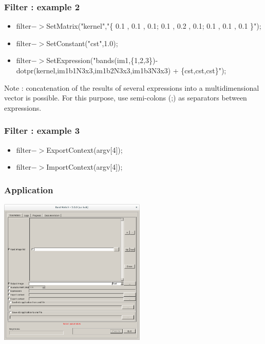 \documentclass[8pt]{beamer}
\begin{document}
\begin{frame}
\frametitle{Filter : example 2}


\begin{itemize}
\item filter$->$SetMatrix("kernel","\{ 0.1 , 0.1 , 0.1; 0.1 , 0.2 , 0.1; 0.1 , 0.1 , 0.1 \}");
\item filter$->$SetConstant("cst",1.0);
\item filter$->$SetExpression("bands(im1,\{1,2,3\})-dotpr(kernel,im1b1N3x3,im1b2N3x3,im1b3N3x3) + \{cst,cst,cst\}");  

\end{itemize}

Note : concatenation of the results of several expressions into a multidimensional vector is possible.
For this purpose, use semi-colons (;) as separators between expressions.

\end{frame}




\begin{frame}
\frametitle{Filter : example 3}

\begin{itemize}
\item filter$->$ExportContext(argv[4]);
\item filter$->$ImportContext(argv[4]);
\end{itemize}

\vspace{1cm}




\end{frame}

\begin{frame}
\frametitle{Application}

\includegraphics[width=7cm,height=7cm]{images/bandmathx.png}

\end{frame}
\end{document}
